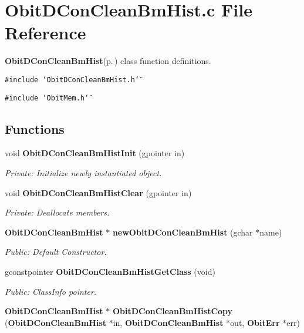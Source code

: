 \section{Obit\-DCon\-Clean\-Bm\-Hist.c File Reference}
\label{ObitDConCleanBmHist_8c}
{\bf Obit\-DCon\-Clean\-Bm\-Hist}{\rm (p.\,\pageref{structObitDConCleanBmHist})} class function definitions. 

{\tt \#include \char`\"{}Obit\-DCon\-Clean\-Bm\-Hist.h\char`\"{}}\par
{\tt \#include \char`\"{}Obit\-Mem.h\char`\"{}}\par
\subsection*{Functions}
\begin{CompactItemize}
\item 
void {\bf Obit\-DCon\-Clean\-Bm\-Hist\-Init} (gpointer in)
\begin{CompactList}\small\item\em Private: Initialize newly instantiated object. \item\end{CompactList}\item 
void {\bf Obit\-DCon\-Clean\-Bm\-Hist\-Clear} (gpointer in)
\begin{CompactList}\small\item\em Private: Deallocate members. \item\end{CompactList}\item 
{\bf Obit\-DCon\-Clean\-Bm\-Hist} $\ast$ {\bf new\-Obit\-DCon\-Clean\-Bm\-Hist} (gchar $\ast$name)
\begin{CompactList}\small\item\em Public: Default Constructor. \item\end{CompactList}\item 
gconstpointer {\bf Obit\-DCon\-Clean\-Bm\-Hist\-Get\-Class} (void)
\begin{CompactList}\small\item\em Public: Class\-Info pointer. \item\end{CompactList}\item 
{\bf Obit\-DCon\-Clean\-Bm\-Hist} $\ast$ {\bf Obit\-DCon\-Clean\-Bm\-Hist\-Copy} ({\bf Obit\-DCon\-Clean\-Bm\-Hist} $\ast$in, {\bf Obit\-DCon\-Clean\-Bm\-Hist} $\ast$out, {\bf Obit\-Err} $\ast$err)

\end{CompactItemize}
